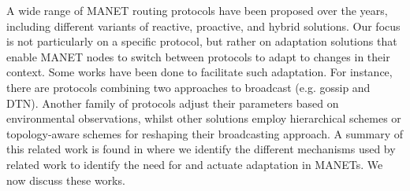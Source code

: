 

A wide range of MANET routing protocols have been proposed over the years, including different variants of reactive, proactive, and hybrid solutions. 
Our focus is not particularly on a specific protocol, but rather on adaptation solutions that enable MANET nodes to switch between protocols to adapt to changes in their context. 
Some works have been done to facilitate such adaptation. 
For instance, there are protocols combining two approaches to broadcast (e.g. gossip and DTN).
Another family of protocols adjust their parameters based on environmental observations, whilst other solutions employ hierarchical schemes or topology-aware schemes for reshaping their broadcasting approach.
A summary of this related work is found in  where we identify the different mechanisms used by related work to identify the need for and actuate adaptation in MANETs. 
We now discuss these works.


